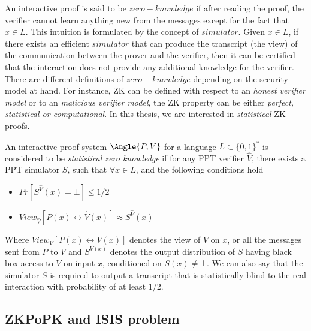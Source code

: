An interactive proof is said to be \(zero-knowledge \) if after reading the
proof, the verifier cannot learn anything new from the messages except for the
fact that \(x \in L\). This intuition is formulated by the concept of
\(simulator\). Given \(x \in L\), if there exists an efficient \(simulator\) that
can produce the transcript (the view) of the communication between the prover
and the verifier, then it can be certified that the interaction does not provide any additional
knowledge for the verifier. There are different definitions of \(zero-knowledge\)
depending on the security model at hand. For instance, ZK can be defined with
respect to an \textit{honest verifier model} or to an \textit{malicious verifier model},
the ZK property can be either \textit{perfect, statistical or computational}. In
this thesis, we are interested in \textit{statistical } ZK proofs.

\begin{definition}
   An interactive proof system \(\Angle{P,V}\) for a language
  \(L \subset \{0,1\}^{*}\) is considered to be \textit{statistical zero knowledge } if
  for any PPT verifier \(\hat{V}\), there exists a PPT simulator \(S\), such
  that \(\forall x \in L\), and the following conditions hold
  \begin{itemize}
  \item \(Pr[S^{\hat{V}}(x) = \bot] \leq 1/2\)
  \item \(View_{\hat{V}}[P(x) \leftrightarrow \hat{V}(x)] \approx S^{\hat{V}}(x)\)
  \end{itemize}
\end{definition}
Where \(View_{V}[P(x) \leftrightarrow V(x)]\) denotes the view of \(V\) on
\(x\), or all the messages sent from \(P\) to \(V\) and \(S^{V(x)}\) denotes the
output distribution of \(S\) having black box access to \(V\) on input \(x\),
conditioned on \(S(x) \neq \bot\).  We can also say that the simulator \(S\) is
required to output a transcript that is statistically blind to the real
interaction with probability of at least 1/2.

\subsection{ZKPoPK and ISIS problem}
\label{sec:zkpIsisi}

